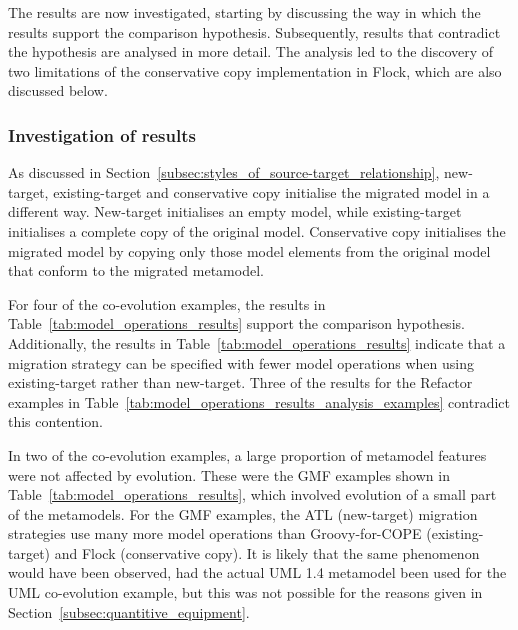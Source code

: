 The results are now investigated, starting by discussing the way in which the results support the comparison hypothesis. Subsequently, results that contradict the hypothesis are analysed in more detail. The analysis led to the discovery of two limitations of the conservative copy implementation in Flock, which are also discussed below.


\subsubsection{Investigation of results}
As discussed in Section~\ref{subsec:styles_of_source-target_relationship}, new-target, existing-target and conservative copy initialise the migrated model in a different way. New-target initialises an empty model, while existing-target initialises a complete copy of the original model. Conservative copy initialises the migrated model by copying only those model elements from the original model that conform to the migrated metamodel.

For four of the co-evolution examples, the results in Table~\ref{tab:model_operations_results} support the comparison hypothesis. Additionally, the results in Table~\ref{tab:model_operations_results} indicate that a migration strategy can be specified with fewer model operations when using existing-target rather than new-target. Three of the results for the Refactor examples in Table~\ref{tab:model_operations_results_analysis_examples} contradict this contention.

In two of the co-evolution examples, a large proportion of metamodel features were not affected by evolution. These were the GMF examples shown in Table~\ref{tab:model_operations_results}, which involved evolution of a small part of the metamodels. For the GMF examples, the ATL (new-target) migration strategies use many more model operations than Groovy-for-COPE (existing-target) and Flock (conservative copy). It is likely that the same phenomenon would have been observed, had the actual UML 1.4 metamodel been used for the UML co-evolution example, but this was not possible for the reasons given in Section~\ref{subsec:quantitive_equipment}.


